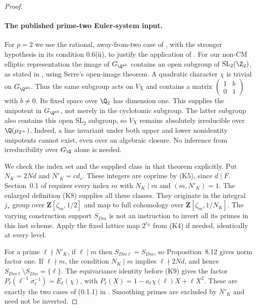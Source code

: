 \begin{proof}
\paragraph{The published prime-two Euler-system input.}
For $p=2$ we use the rational, away-from-two case of
\cite[Theorem 0.8, pp.~317--318]{kato1999}, with the stronger
hypothesis in its condition 0.6(ii), to justify the application of
\cite[Theorem 13.4(2)]{kato}. For our non-CM elliptic representation
the image of $G_{\Q^{\rm ab}}$ contains an open subgroup of
$\mathrm{SL}_2(\Z_2)$, as stated in
\cite[Example 0.6.2, pp.~317--318]{kato1999}, using Serre's open-image
theorem. A quadratic character $\chi$ is trivial on $G_{\Q^{\rm ab}}$.
Thus the same subgroup acts on $V\chi$ and contains a matrix
$\left(\begin{smallmatrix}1&b\\0&1\end{smallmatrix}\right)$ with
$b\ne0$. Its fixed space over $\Q_2$ has dimension one. This supplies
the unipotent in $G_{\Q^{\rm ab}}$, not merely in the cyclotomic
subgroup. The latter subgroup also contains this open
$\mathrm{SL}_2$ subgroup, so $V\chi$ remains absolutely irreducible
over $\Q(\mu_{2^\infty})$. Indeed, a line invariant under both upper
and lower nonidentity unipotents cannot exist, even over an algebraic
closure. No inference from irreducibility over $G_\Q$ alone is needed.

We check the index set and the supplied class in that theorem
explicitly. Put $N_K=2Nd$ and $N'_K=cd_s$. These integers are
coprime by (K5), since $d\mid F$. Section~0.1 of \cite{kato1999}
requires every index $m$ with $N_K\mid m$ and $(m,N'_K)=1$.
The enlarged definition (K8) supplies all these classes. They
originate in the integral $j_*$ group over
$\mathbf Z[\zeta_m,1/2]$ and map to full cohomology over
$\mathbf Z[\zeta_m,1/N_K]$. The varying construction support
$S_{Dm}$ is not an instruction to invert all its primes in this
last scheme. Apply the fixed lattice map $2^{c_E}$ from (K4) if
needed, identically at every level.

For a prime $\ell\nmid N'_K$, if $\ell\mid m$ then
$S_{Dm\ell}=S_{Dm}$, so Proposition~8.12 gives norm factor one.
If $\ell\nmid m$, the condition $N_K\mid m$ implies
$\ell\nmid2Nd$, and hence
$S_{Dm\ell}\setminus S_{Dm}=\{\ell\}$. The equivariance identity
before (K9) gives the factor
$P_\ell(\ell^{-1}\sigma_\ell^{-1})=E_\ell(\chi)$, with
$P_\ell(X)=1-a_\ell\chi(\ell)X+\ell X^2$. These are exactly the
two cases of (0.1.1) in \cite{kato1999}. Smoothing primes are
excluded by $N'_K$ and need not be inverted.


\end{proof}
